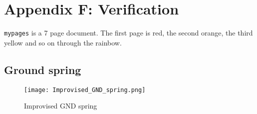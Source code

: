 \chapter*{Appendix F: Verification} \label{chap:Appendix-C-Verification}



\verb|mypages| is a 7 page document.
The first page is red, the second orange, the third yellow and so on through the rainbow.






\section*{Ground spring} \label{Appendix-Ground-spring}
\begin{figure}[!htb]
    \texttt{[image: Improvised\_GND\_spring.png]}
    \caption{Improvised GND spring}
    \label{fig:Improvised_GND_spring}
\end{figure}